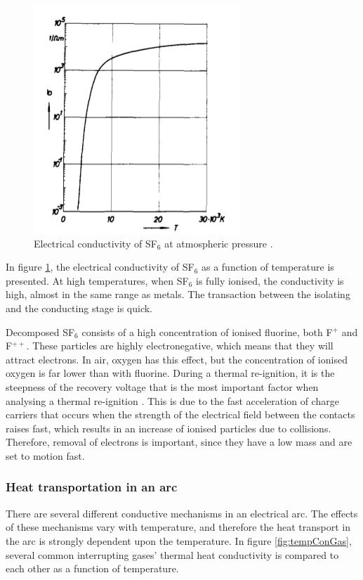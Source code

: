 \documentclass[10pt,a4paper,twoside]{article}
\begin{document}
\begin{figure}[H]
\centering
\includegraphics[scale=0.5]{Bilder/Theory/SF6Conduct.png}
\caption{Electrical conductivity of SF$_6$ at atmospheric pressure \cite{bib:IPSF6AQM}.} \label{fig:condSF6}
\end{figure}

In figure \ref{fig:condSF6}, the electrical conductivity of SF$_6$ as a function of temperature is presented. At high temperatures, when SF$_6$ is fully ionised, the conductivity is high, almost in the same range as metals. The transaction between the isolating and the conducting stage is quick.

Decomposed SF$_6$ consists of a high concentration of ionised fluorine, both F$^{+}$ and F$^{++}$. These particles are highly electronegative, which means that they will attract electrons. In air, oxygen has this effect, but the concentration of ionised oxygen is far lower than with fluorine. During a thermal re-ignition, it is the steepness of the recovery voltage that is the most important factor when analysing a thermal re-ignition \cite{bib:HVEbreak}. This is due to the fast acceleration of charge carriers that occurs when the strength of the electrical field between the contacts raises fast, which results in an increase of ionised particles due to collisions. Therefore, removal of electrons is important, since they have a low mass and are set to motion fast.
   
\subsubsection{Heat transportation in an arc} \label{sec:HeatTransport}
There are several different conductive mechanisms in an electrical arc. The effects of these mechanisms vary with temperature, and therefore the heat transport in the arc is strongly dependent upon the temperature. In figure \ref{fig:tempConGas}, several common interrupting gases' thermal heat conductivity is compared to each other as a function of temperature.
\end{document}
